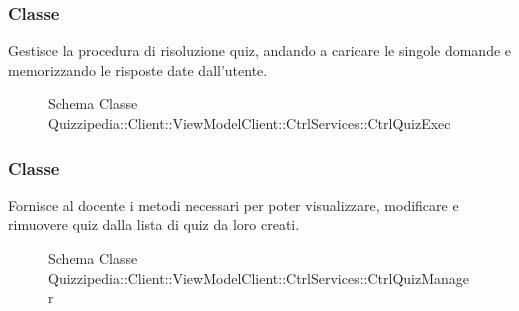\subsubsection{Classe }
Gestisce la procedura di risoluzione quiz, andando a caricare le singole domande e memorizzando le risposte date dall'utente.
\begin{figure}[H]
\centering
\noindent{}
\caption[Schema Classe CtrlQuizExec]{Schema Classe Quizzipedia::Client::ViewModelClient::CtrlServices::CtrlQuizExec}
\end{figure}
\subsubsection{Classe }
Fornisce al docente i metodi necessari per poter visualizzare, modificare e rimuovere quiz dalla lista di quiz da loro creati.
\begin{figure}[H]
\centering
\noindent{}
\caption[Schema Classe CtrlQuizManager]{Schema Classe Quizzipedia::Client::ViewModelClient::CtrlServices::CtrlQuizManager}
\end{figure}
